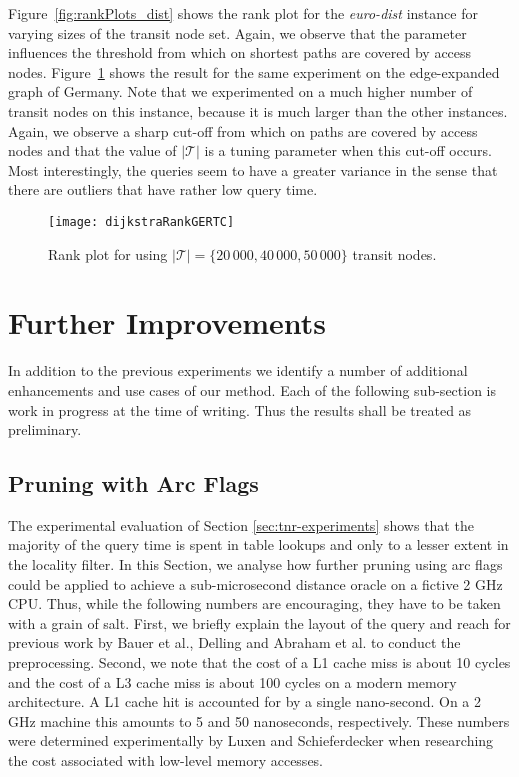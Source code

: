 \documentclass{llncs}
\newcommand{\etal}{et al.\xspace}
\begin{document}
Figure~\ref{fig:rankPlots_dist} shows the rank plot for the \emph{euro-dist} instance for varying sizes of the transit node set.
Again, we observe that the parameter influences the threshold from which on shortest paths are covered by access nodes.
Figure~\ref{fig:rankPlots_ger} shows the result for the same experiment on the edge-expanded graph of Germany.
Note that we experimented on a much higher number of transit nodes on this instance, because it is much larger than the other instances.
Again, we observe a sharp cut-off from which on paths are covered by access nodes and that the value of $\vert\mathcal{T}\vert$ is a tuning parameter when this cut-off occurs.
Most interestingly, the queries seem to have a greater variance in the sense that there are outliers that have rather low query time.
\begin{figure}[t!]
\centering
	\texttt{[image: dijkstraRankGERTC]}
	\caption{Rank plot for using $\vert\mathcal{T}\vert=\{20\,000, 40\,000, 50\,000\}$ transit nodes.}
\label{fig:rankPlots_ger}
\end{figure}

\section{Further Improvements}

In addition to the previous experiments we identify a number of additional enhancements and use cases of our method.
Each of the following sub-section is work in progress at the time of writing.
Thus the results shall be treated as preliminary.

\subsection{Pruning with Arc Flags}\label{sec:tnr-af}
The experimental evaluation of Section \ref{sec:tnr-experiments} shows that the majority of the query time is spent in table lookups and only to a lesser extent in the locality filter.
In this Section, we analyse how further pruning using arc flags could be applied to achieve a sub-microsecond distance oracle on a fictive 2 GHz CPU.
Thus, while the following numbers are encouraging, they have to be taken with a grain of salt.
First, we briefly explain the layout of the query and reach for previous work by Bauer \etal \cite{bdsssw-chgds-08}, Delling \cite{d-earpa-09} and Abraham \etal \cite{dgnw-phast-12} to conduct the preprocessing.
Second, we note that the cost of a L1 cache miss is about 10 cycles and the cost of a L3 cache miss is about 100 cycles on a modern memory architecture.
A L1 cache hit is accounted for by a single nano-second.
On a 2 GHz machine this amounts to 5 and 50 nanoseconds, respectively.
These numbers were determined experimentally by Luxen and Schieferdecker \cite{ls-dmlca-12} when researching the cost associated with low-level memory accesses.
\end{document}

